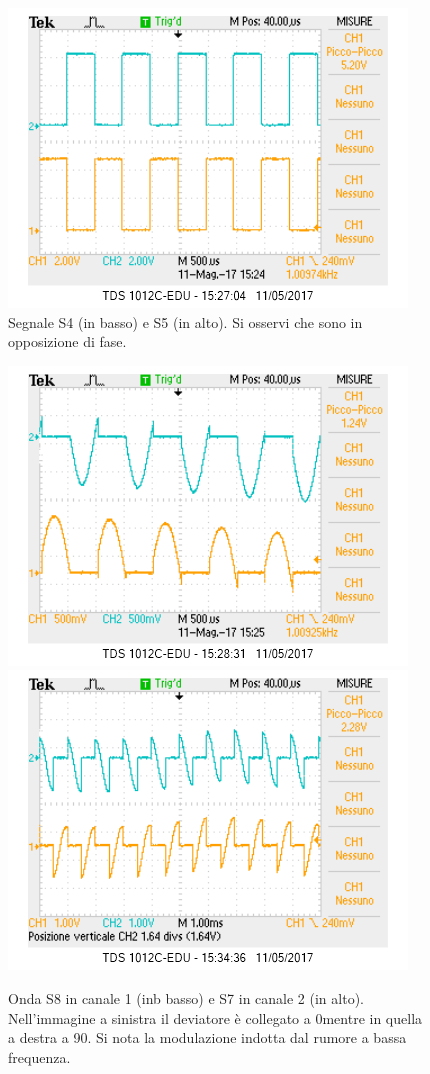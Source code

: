 \documentclass[10pt,a4paper]{article}
\begin{document}
\begin{figure}
\centering
\includegraphics[scale=0.7]{CH1S4-CH2S5.png}
\caption{Segnale S4 (in basso) e S5 (in alto). Si osservi che sono in opposizione di fase.\label{osc:s4s5}}
\end{figure}


\begin{figure}[!htb]
  \centering
  \includegraphics[scale=0.75]{dev0ch1S8-ch2S7.png}\includegraphics[scale=0.75]{dev90ch1S8-ch2S7.png}
\caption{Onda S8 in canale 1 (inb basso) e S7 in canale 2 (in alto). Nell'immagine a sinistra il deviatore è collegato a 0\degree mentre in quella a destra a 90\degree . Si nota la modulazione indotta dal rumore a bassa frequenza.\label{osc:S7S8}}
\end{figure}
\end{document}
